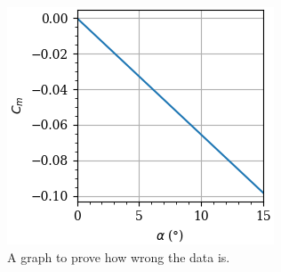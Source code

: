 \documentclass[12pt]{article} %
\begin{document}
\begin{figure}[H]
    \centering
    \includegraphics[width=\linewidth]{stupid_plot.png}
    \caption{A graph to prove how wrong the data is.}
    \label{fig:bar}
\end{figure}
\end{document}
